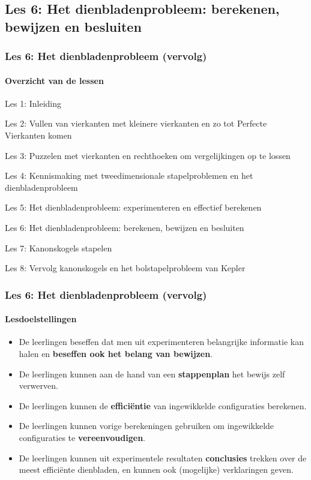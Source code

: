 \documentclass[dutch]{beamer}
\begin{document}



\subsection{Les 6: Het dienbladenprobleem: berekenen, bewijzen en besluiten}
\begin{frame}
\frametitle{Les 6: Het dienbladenprobleem {\small (vervolg)}}
\framesubtitle{Overzicht van de lessen}
\begin{list}{\quad}{}
\item Les 1: Inleiding
\item Les 2: Vullen van vierkanten met kleinere vierkanten en zo tot Perfecte Vierkanten komen
\item Les 3: Puzzelen met vierkanten en rechthoeken om vergelijkingen op te lossen
\item Les 4: Kennismaking met tweedimensionale stapelproblemen en het dienbladenprobleem 
\item Les 5: Het dienbladenprobleem: experimenteren en effectief berekenen
\item {\color{blue}Les 6: Het dienbladenprobleem: berekenen, bewijzen en besluiten}
\item Les 7: Kanonskogels stapelen
\item Les 8: Vervolg kanonskogels en het bolstapelprobleem van Kepler
\end{list}
\end{frame}

\begin{frame}
\frametitle{Les 6: Het dienbladenprobleem {\small (vervolg)}}
\framesubtitle{Lesdoelstellingen}
\begin{itemize}
\item De leerlingen beseffen dat men uit experimenteren belangrijke informatie kan halen en \textbf{beseffen ook het belang van bewijzen}.
\item De leerlingen kunnen aan de hand van een \textbf{stappenplan} het bewijs zelf verwerven.
\item De leerlingen kunnen de \textbf{effici\"{e}ntie} van ingewikkelde configuraties berekenen.
\item De leerlingen kunnen vorige berekeningen gebruiken om ingewikkelde configuraties te \textbf{vereenvoudigen}.
\item De leerlingen kunnen uit experimentele resultaten \textbf{conclusies} trekken over de meest effici\"{e}nte dienbladen, en kunnen ook (mogelijke) verklaringen geven.
\end{itemize}
\end{frame}
\end{document}
